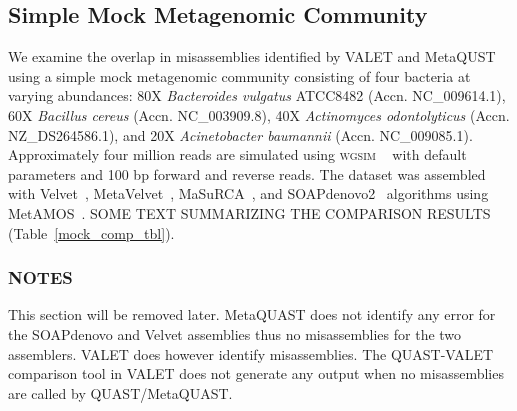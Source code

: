 \documentclass{article}
\begin{document}
\subsection{Simple Mock Metagenomic Community}
We examine the overlap in misassemblies identified by VALET and MetaQUST using a simple mock metagenomic community consisting of four bacteria at varying abundances: 80X \emph{Bacteroides vulgatus}  ATCC8482 (Accn. NC\_009614.1), 60X \emph{Bacillus cereus} (Accn. NC\_003909.8), 40X \emph{Actinomyces odontolyticus} (Accn. NZ\_DS264586.1), and 20X \emph{Acinetobacter baumannii} (Accn. NC\_009085.1).
Approximately four million reads are simulated using \textsc{wgsim} ~\citep{li2013wgsim} with default parameters and 100 bp forward and reverse reads.
The dataset was assembled with Velvet~\citep{zerbino2008velvet}, MetaVelvet~\citep{namiki2012metavelvet}, MaSuRCA~\citep{zimin2013masurca}, and SOAPdenovo2~\citep{luo2012soapdenovo2} algorithms using MetAMOS~\citep{treangen2013metamos}.
SOME TEXT SUMMARIZING THE COMPARISON RESULTS (Table~\ref{mock_comp_tbl}).  
\subsubsection{NOTES}
This section will be removed later. MetaQUAST does not identify any error for the SOAPdenovo and Velvet assemblies thus no misassemblies for the two assemblers. VALET does however identify misassemblies. The QUAST-VALET comparison tool in VALET does not generate any output when no misassemblies are called by QUAST/MetaQUAST.  
\end{document}
